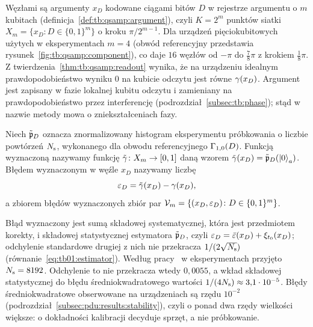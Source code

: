 Węzłami są argumenty $x_D$ kodowane ciągami bitów $D$ w rejestrze argumentu o $m$ kubitach (definicja~\ref{def:tb:qsamp:argument}), czyli $K=2^{m}$ punktów siatki $X_m=\{x_D\colon D\in\{0,1\}^m\}$ o kroku $\pi/2^{m-1}$.
Dla urządzeń pięciokubitowych użytych w eksperymentach $m=4$ (obwód referencyjny przedstawia rysunek~\ref{fig:tb:qsamp:component}), co daje $16$ węzłów od $-\pi$ do $\tfrac{7}{8}\pi$ z krokiem $\tfrac{1}{8}\pi$.
Z twierdzenia~\ref{thm:tb:qsamp:readout} wynika, że na urządzeniu idealnym prawdopodobieństwo wyniku $0$ na kubicie odczytu jest równe $\gamma(x_D)$.
Argument jest zapisany w fazie lokalnej kubitu odczytu i zamieniany na prawdopodobieństwo przez interferencję (podrozdział~\ref{subsec:tb:phase}); stąd w nazwie metody mowa o zniekształceniach fazy.

\begin{Definition}\label{def:pdu:errors}
Niech $\tilde{\mathfrak{p}}_D$ oznacza znormalizowany histogram eksperymentu próbkowania o liczbie powtórzeń $N_{\mathrm{s}}$, wykonanego dla obwodu referencyjnego $\Gamma_{1,0}(D)$.
Funkcją wyznaczoną nazywamy funkcję $\tilde{\gamma}\colon X_m\to[0,1]$ daną wzorem $\tilde{\gamma}(x_D)=\tilde{\mathfrak{p}}_D(\ket{0}_a)$.
Błędem wyznaczonym w węźle $x_D$ nazywamy liczbę
\begin{equation}\label{eq:pdu:error}
\varepsilon_D=\tilde{\gamma}(x_D)-\gamma(x_D),
\end{equation}
a zbiorem błędów wyznaczonych zbiór par $\mathcal{V}_m=\{(x_D,\varepsilon_D)\colon D\in\{0,1\}^m\}$.
\end{Definition}

Błąd wyznaczony jest sumą składowej systematycznej, która jest przedmiotem korekty, i składowej statystycznej estymatora $\tilde{\mathfrak{p}}_D$, czyli $\varepsilon_D=\bar{\varepsilon}(x_D)+\xi_{t_0}(x_D)$; odchylenie standardowe drugiej z nich nie przekracza $1/(2\sqrt{N_{\mathrm{s}}})$ (równanie~\eqref{eq:tb01:estimator}).
Według pracy~\cite{werner_experiment_driven_2022} w eksperymentach przyjęto $N_{\mathrm{s}}=8192$.
Odchylenie to nie przekracza wtedy $0{,}0055$, a wkład składowej statystycznej do błędu średniokwadratowego wartości $1/(4N_{\mathrm{s}})\approx 3{,}1\cdot 10^{-5}$.
Błędy średniokwadratowe obserwowane na urządzeniach są rzędu $10^{-2}$ (podrozdział~\ref{subsec:pdu:results:stability}), czyli o ponad dwa rzędy wielkości większe: o dokładności kalibracji decyduje sprzęt, a nie próbkowanie.

